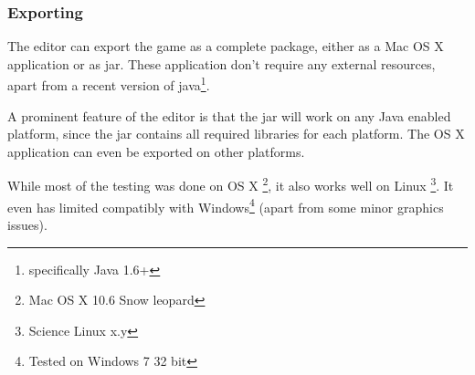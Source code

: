 \clearpage
\subsubsection{Exporting}
\label{ssub:exporting}

The editor can export the game as a complete package, either as a Mac OS X application or as jar. These application don't require any external resources, apart from a recent version of java\footnote{specifically Java 1.6+}.

A prominent feature of the editor is that the jar will work on any Java enabled platform, since the jar contains all required libraries for each platform. The OS X application can even be exported on other platforms.

While most of the testing was done on OS X \footnote{Mac OS X 10.6 Snow leopard}, it also works well on Linux \footnote{Science  Linux x.y}. It even has limited compatibly with Windows\footnote{Tested on Windows 7 32 bit} (apart from some minor graphics issues).
